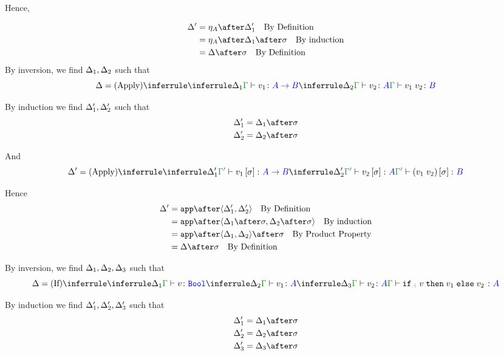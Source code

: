 \documentclass{report}
\begin{document}
Hence,

\begin{align}
    \D' & = \point{A}\after\D_1'\qt{By Definition}\\
    & = \point{A}\after\D_1\after\si\qt{By induction}\\
    & = \D\after\si\qt{By Definition}\\
\end{align}
By inversion, we find $\Delta_1, \Delta_2$ such that
\begin{equation}
    \D = \ntreeruleII{Apply}{\treeruleI{\D_1}{\typerelation{\G}{v_1}{\ab}}}{\treeruleI{\D_2}{\typerelation{\G}{v_2}{A}}}{\typerelation{\G}{\apply{v_1}{v_2}}{B}}
\end{equation}

By induction we find $\Delta_1', \Delta_2'$ such that 
\begin{align}
    \D_1' &= \D_1\after\si\\
    \D_2' &= \D_2\after\si\\
\end{align}

And
\begin{equation}
    \D' = \ntreeruleII{Apply}{\treeruleI{\D_1'}{\typerelation{\G'}{v_1\ssi}{\ab}}}{\treeruleI{\D_2'}{\typerelation{\G'}{v_2\ssi}{A}}}{\typerelation{\G'}{(\apply{v_1}{v_2})\ssi}{B}}
\end{equation}

Hence
\begin{align}
    \D' &= \app\after\pr{\D_1'}{\D_2'}\qt{By Definition}\\
        &= \app\after\pr{\D_1\after\si}{\D_2\after\si}\qt{By induction}\\
        &= \app\after\pr{\D_1}{\D_2}\after\si\qt{By Product Property}\\
        & = \D\after\si\qt{By Definition}\\
\end{align}



By inversion, we find $\Delta_1, \Delta_2, \Delta_3$ such that
\begin{equation}
    \D = \ntreeruleIII{If}{\treeruleI{\D_1}{\typerelation{\G}{v}{\B}}}{\treeruleI{\D_2}{\typerelation{\G}{v_1}{ A}}}{\treeruleI{\D_3}{\typerelation{\G}{v_2}{ A}}}{\typerelation{\G}{\pifthenelse{A}{v}{v_1}{v_2}}{ A}}
\end{equation}

By induction we find $\Delta_1', \Delta_2', \Delta_3'$ such that 
\begin{align}
    \D_1' &= \D_1\after\si\\
    \D_2' &= \D_2\after\si\\
    \D_3' &= \D_3\after\si\\
\end{align}
\end{document}
